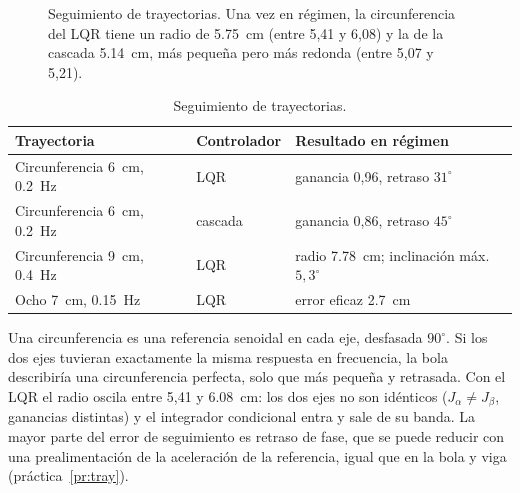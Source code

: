 \begin{figure}[H]
\centering
{}
\caption{Seguimiento de trayectorias. Una vez en régimen, la circunferencia del LQR tiene un radio de \SI{5.75}{cm} (entre 5,41 y 6,08) y la de la cascada \SI{5.14}{cm}, más pequeña pero más redonda (entre 5,07 y 5,21).}
\label{fig:tray}
\end{figure}

\begin{table}[H]
\centering\small
\begin{tabular}{@{}lll@{}}
\toprule
Trayectoria & Controlador & Resultado en régimen\\
\midrule
Circunferencia \SI{6}{cm}, \SI{0.2}{Hz} & LQR & ganancia 0,96, retraso $31^\circ$\\
Circunferencia \SI{6}{cm}, \SI{0.2}{Hz} & cascada & ganancia 0,86, retraso $45^\circ$\\
Circunferencia \SI{9}{cm}, \SI{0.4}{Hz} & LQR & radio \SI{7.78}{cm}; inclinación máx. $5{,}3^\circ$\\
Ocho \SI{7}{cm}, \SI{0.15}{Hz} & LQR & error eficaz \SI{2.7}{cm}\\
\bottomrule
\end{tabular}
\caption{Seguimiento de trayectorias.}
\end{table}

Una circunferencia es una referencia senoidal en cada eje, desfasada $90^\circ$. Si los dos ejes tuvieran exactamente la misma respuesta en frecuencia, la bola describiría una circunferencia perfecta, solo que más pequeña y retrasada. Con el LQR el radio oscila entre 5,41 y \SI{6.08}{cm}: los dos ejes no son idénticos ($J_\alpha\neq J_\beta$, ganancias distintas) y el integrador condicional entra y sale de su banda. La mayor parte del error de seguimiento es retraso de fase, que se puede reducir con una prealimentación de la aceleración de la referencia, igual que en la bola y viga (práctica~\ref{pr:tray}).

